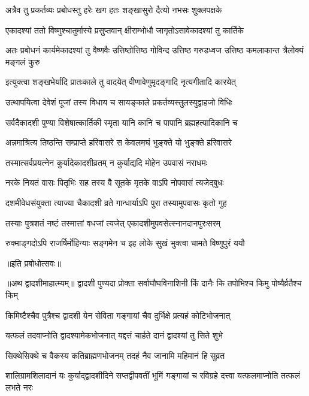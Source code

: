 \twolineshloka
{अत्रैव तु प्रकर्तव्यः प्रबोधस्तु हरेः खग}
{हतः शङ्खासुरो दैत्यो नभसः शुक्लपक्षके} %

\twolineshloka
{एकादश्यां ततो विष्णुश्चातुर्मास्ये प्रसुप्तवान्}
{क्षीराम्भोधौ जागृतोऽसावेकादश्यां तु कार्तिके} %

\threelineshloka
{अतः प्रबोधनं कार्यमेकादश्यां तु वैष्णवैः}
{उत्तिष्ठोत्तिष्ठ गोविन्द उत्तिष्ठ गरुडध्वज}
{उत्तिष्ठ कमलाकान्त त्रैलोक्यं मङ्गलं कुरु} %

\twolineshloka
{इत्युक्त्वा शङ्खभेर्यादि प्रातःकाले तु वादयेत्}
{वीणावेणुमृदङ्गादि नृत्यगीतादि कारयेत्} %

\twolineshloka
{उत्थापयित्वा देवेशं पूजां तस्य विधाय च}
{सायङ्काले प्रकर्तव्यस्तुलस्युद्वाहजो विधिः} %

\twolineshloka
{सर्वदैकादशी पुण्या विशेषात्कार्तिकी स्मृता}
{यानि कानि च पापानि ब्रह्महत्यादिकानि च} %

\twolineshloka
{अन्नमाश्रित्य तिष्ठन्ति सम्प्राप्ते हरिवासरे}
{स केवलमघं भुङ्क्ते यो भुङ्क्ते हरिवासरे} %

\twolineshloka
{तस्मात्सर्वप्रयत्नेन कुर्यादेकादशीव्रतम्}
{न कुर्याद्यदि मोहेन उपवासं नराधमः} %

\twolineshloka
{नरके नियतं वासः पितृभिः सह तस्य वै}
{सूतके मृतके वाऽपि नोपवासं त्यजेद्बुधः} %

\twolineshloka
{दशमीवेधसंयुक्ता त्याज्या चैकादशी व्रते}
{गान्धार्याऽपि पुरा तस्यामुपवासः कृतो गुह} %

\twolineshloka
{तस्याः पुत्रशतं नष्टं तस्मात्तां वधजां त्यजेत्}
{एकादशीमुपवसेत्स्नानदानपुरःसरम्} %

\twolineshloka
{रुक्माङ्गदोऽपि राजर्षिर्मोहिन्याः सङ्गमेन च}
{इह लोके सुखं भुक्त्वा चामते विष्णुपुरं ययौ} %


॥इति प्रबोधोत्सवः॥

॥अथ द्वादशीमाहात्म्यम्॥
\twolineshloka
{द्वादशी पुण्यदा प्रोक्ता सर्वाघौघविनाशिनी}
{किं दानैः कि तपोभिश्च किमु पोष्यैर्व्रतैश्च किम्} %

\twolineshloka
{किमिष्टैश्चैव पुत्रैश्च द्वादशी येन सेविता}
{गङ्गायां चैव दुर्भिक्षे प्रत्यहं कोटिभोजनात्} %

\twolineshloka
{यत्फलं तदवाप्नोति द्वादश्यामेकभोजनात्}
{यद्दत्तं चार्हते दानं द्वादश्यां तु सिते शुभे} %

\twolineshloka
{सिक्थेसिक्थे च वैकस्य कतिब्राह्मणभोजनम्}
{तदहं नैव जानामि महिमानं हि सुव्रत} %

\threelineshloka
{शालिग्रामशिलादानं यः कुर्याद्द्वादशीदिने}
{सप्तद्वीपवतीं भूमिं गङ्गायां च रविग्रहे}
{दत्त्वा यत्फलमाप्नोति तत्फलं लभते नरः} %

